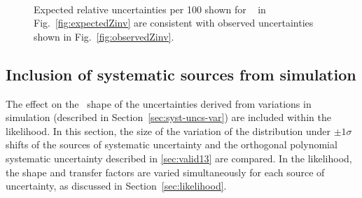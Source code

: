\begin{figure}[h!]
  \centering
  ~~
  \\
  \caption{\label{fig:expectedObservedZinv}Expected relative uncertainties per 100 \GeV shown for \zInv~ in Fig.~\ref{fig:expectedZinv} are consistent
  with observed uncertainties shown in Fig.~\ref{fig:observedZinv}.}
\end{figure}



\newpage
\subsection{Inclusion of systematic sources from simulation}
\label{sec:mcSystStudiesShape}

The effect on the \mht~shape of the uncertainties derived from variations in simulation 
(described in Section~\ref{sec:syst-uncs-var}) are included within the likelihood.
In this section, the size of the variation of the \mht distribution under $\pm1\sigma$ shifts of the
sources of systematic uncertainty and the orthogonal polynomial systematic uncertainty
described in \ref{sec:valid13} are compared. In the likelihood, the \mht shape and transfer factors
are varied simultaneously for each source of uncertainty, as discussed in Section~\ref{sec:likelihood}.

